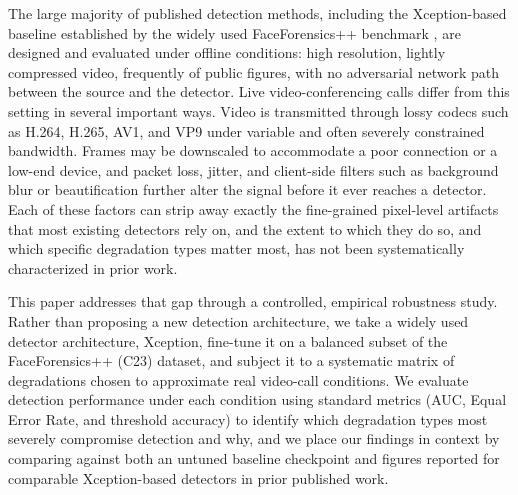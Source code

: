 \documentclass[conference]{IEEEtran}
\begin{document}
The large majority of published detection methods, including the Xception-based baseline established by the widely used FaceForensics++ benchmark \cite{rossler2019faceforensicspp}, are designed and evaluated under offline conditions: high resolution, lightly compressed video, frequently of public figures, with no adversarial network path between the source and the detector. Live video-conferencing calls differ from this setting in several important ways. Video is transmitted through lossy codecs such as H.264, H.265, AV1, and VP9 under variable and often severely constrained bandwidth. Frames may be downscaled to accommodate a poor connection or a low-end device, and packet loss, jitter, and client-side filters such as background blur or beautification further alter the signal before it ever reaches a detector. Each of these factors can strip away exactly the fine-grained pixel-level artifacts that most existing detectors rely on, and the extent to which they do so, and which specific degradation types matter most, has not been systematically characterized in prior work.

This paper addresses that gap through a controlled, empirical robustness study. Rather than proposing a new detection architecture, we take a widely used detector architecture, Xception, fine-tune it on a balanced subset of the FaceForensics++ (C23) dataset, and subject it to a systematic matrix of degradations chosen to approximate real video-call conditions. We evaluate detection performance under each condition using standard metrics (AUC, Equal Error Rate, and threshold accuracy) to identify which degradation types most severely compromise detection and why, and we place our findings in context by comparing against both an untuned baseline checkpoint and figures reported for comparable Xception-based detectors in prior published work.
\end{document}
